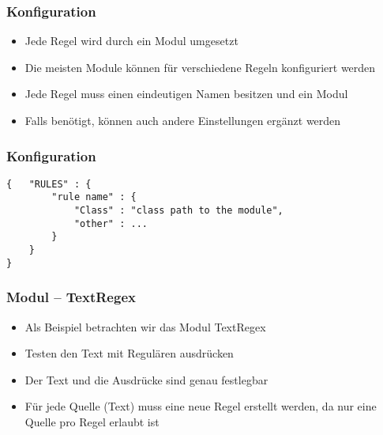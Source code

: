 \begin{frame}[fragile]
\frametitle{Konfiguration}
\begin{block}{\vspace*{-3ex}}
\begin{itemize}
\item Jede Regel wird durch ein Modul umgesetzt
\item Die meisten Module können für verschiedene Regeln konfiguriert werden
\item Jede Regel muss einen eindeutigen Namen besitzen und ein Modul
\item Falls benötigt, können auch andere Einstellungen ergänzt werden
\end{itemize}
\end{block}
\end{frame}

\begin{frame}[fragile]
\frametitle{Konfiguration}
\begin{block}{\vspace*{-3ex}}
\begin{lstlisting}
{	"RULES" : {
        "rule name" : {
            "Class" : "class path to the module",
            "other" : ...
        }
    }
}
\end{lstlisting}
\end{block}
\end{frame}

\begin{frame}
\frametitle{Modul -- TextRegex}
\begin{block}{\vspace*{-3ex}}
\begin{itemize}
\item Als Beispiel betrachten wir das Modul TextRegex
\item Testen den Text mit Regulären ausdrücken
\item Der Text und die Ausdrücke sind genau festlegbar
\item Für jede Quelle (Text) muss eine neue Regel erstellt werden, da nur eine Quelle pro Regel erlaubt ist
\end{itemize}
\end{block}
\end{frame}

